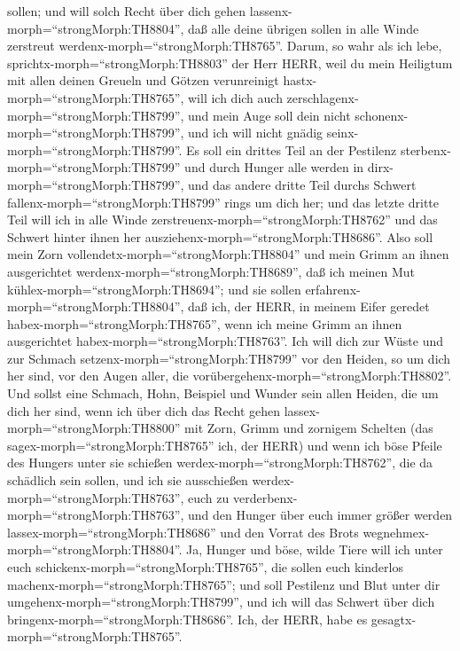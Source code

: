 sollen; und will solch Recht über dich gehen
lassenx-morph=``strongMorph:TH8804'', daß alle deine übrigen sollen in
alle Winde zerstreut werdenx-morph=``strongMorph:TH8765''. 
Darum, so wahr als ich lebe, sprichtx-morph=``strongMorph:TH8803'' der
Herr HERR, weil du mein Heiligtum mit allen deinen Greueln und Götzen
verunreinigt hastx-morph=``strongMorph:TH8765'', will ich dich auch
zerschlagenx-morph=``strongMorph:TH8799'', und mein Auge soll dein nicht
schonenx-morph=``strongMorph:TH8799'', und ich will nicht gnädig
seinx-morph=``strongMorph:TH8799''.  Es soll ein drittes
Teil an der Pestilenz sterbenx-morph=``strongMorph:TH8799'' und durch
Hunger alle werden in dirx-morph=``strongMorph:TH8799'', und das andere
dritte Teil durchs Schwert fallenx-morph=``strongMorph:TH8799'' rings um
dich her; und das letzte dritte Teil will ich in alle Winde
zerstreuenx-morph=``strongMorph:TH8762'' und das Schwert hinter ihnen
her ausziehenx-morph=``strongMorph:TH8686''.  Also soll
mein Zorn vollendetx-morph=``strongMorph:TH8804'' und mein Grimm an
ihnen ausgerichtet werdenx-morph=``strongMorph:TH8689'', daß ich meinen
Mut kühlex-morph=``strongMorph:TH8694''; und sie sollen
erfahrenx-morph=``strongMorph:TH8804'', daß ich, der HERR, in meinem
Eifer geredet habex-morph=``strongMorph:TH8765'', wenn ich meine Grimm
an ihnen ausgerichtet habex-morph=``strongMorph:TH8763''. 
Ich will dich zur Wüste und zur Schmach
setzenx-morph=``strongMorph:TH8799'' vor den Heiden, so um dich her
sind, vor den Augen aller, die
vorübergehenx-morph=``strongMorph:TH8802''.  Und sollst
eine Schmach, Hohn, Beispiel und Wunder sein allen Heiden, die um dich
her sind, wenn ich über dich das Recht gehen
lassex-morph=``strongMorph:TH8800'' mit Zorn, Grimm und zornigem
Schelten (das sagex-morph=``strongMorph:TH8765'' ich, der HERR)
 und wenn ich böse Pfeile des Hungers unter sie schießen
werdex-morph=``strongMorph:TH8762'', die da schädlich sein sollen, und
ich sie ausschießen werdex-morph=``strongMorph:TH8763'', euch zu
verderbenx-morph=``strongMorph:TH8763'', und den Hunger über euch immer
größer werden lassex-morph=``strongMorph:TH8686'' und den Vorrat des
Brots wegnehmex-morph=``strongMorph:TH8804''.  Ja, Hunger
und böse, wilde Tiere will ich unter euch
schickenx-morph=``strongMorph:TH8765'', die sollen euch kinderlos
machenx-morph=``strongMorph:TH8765''; und soll Pestilenz und Blut unter
dir umgehenx-morph=``strongMorph:TH8799'', und ich will das Schwert über
dich bringenx-morph=``strongMorph:TH8686''. Ich, der HERR, habe es
gesagtx-morph=``strongMorph:TH8765''.

